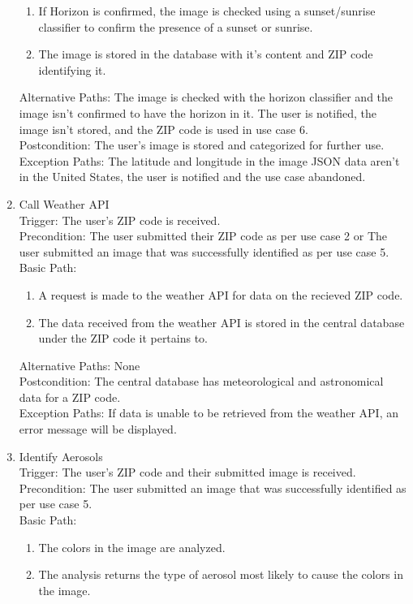 \documentclass[journal,10pt,draftclsnofoot,onecolumn]{IEEEtran}
\begin{document}
\begin{singlespace}
\begin{enumerate}
\begin{enumerate}
\item If Horizon is confirmed, the image is checked using a sunset/sunrise classifier to confirm the presence of a sunset or sunrise.
\item The image is stored in the database with it's content and ZIP code identifying it.
\end{enumerate}
Alternative Paths: The image is checked with the horizon classifier and the image isn't confirmed to have the horizon in it. The user is notified, the image isn't stored, and the ZIP code is used in use case 6.\\
Postcondition: The user's image is stored and categorized for further use.\\
Exception Paths: The latitude and longitude in the image JSON data aren't in the United States, the user is notified and the use case abandoned.
\\
\item Call Weather API\\
Trigger: The user's ZIP code is received.\\
Precondition: The user submitted their ZIP code as per use case 2 or The user submitted an image that was successfully identified as per use case 5.\\
Basic Path:\begin{enumerate}
\item A request is made to the weather API for data on the recieved ZIP code.
\item The data received from the weather API is stored in the central database under the ZIP code it pertains to.
\end{enumerate}
Alternative Paths: None\\
Postcondition: The central database has meteorological and astronomical data for a ZIP code.\\
Exception Paths: If data is unable to be retrieved from the weather API, an error message will be displayed.
\\
\item Identify Aerosols\\
Trigger: The user's ZIP code and their submitted image is received.\\
Precondition: The user submitted an image that was successfully identified as per use case 5.\\
Basic Path:\begin{enumerate}
\item The colors in the image are analyzed.
\item The analysis returns the type of aerosol most likely to cause the colors in the image.

\end{enumerate}
\end{enumerate}
\end{singlespace}
\end{document}
